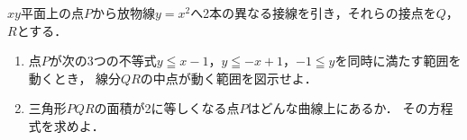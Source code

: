\documentclass[../../main.tex]{subfiles}
\begin{document}
$xy$平面上の点$P$から放物線$y=x^2$へ2本の異なる接線を引き，それらの接点を$Q$，$R$とする．
\begin{enumerate}
  \item 点$P$が次の3つの不等式$y \leqq x-1$，$y \leqq -x+1$，$-1 \leqq y$を同時に満たす範囲を動くとき，
    線分$QR$の中点が動く範囲を図示せよ．
  \item 三角形$PQR$の面積が2に等しくなる点$P$はどんな曲線上にあるか．
    その方程式を求めよ．
\end{enumerate}
\end{document}
